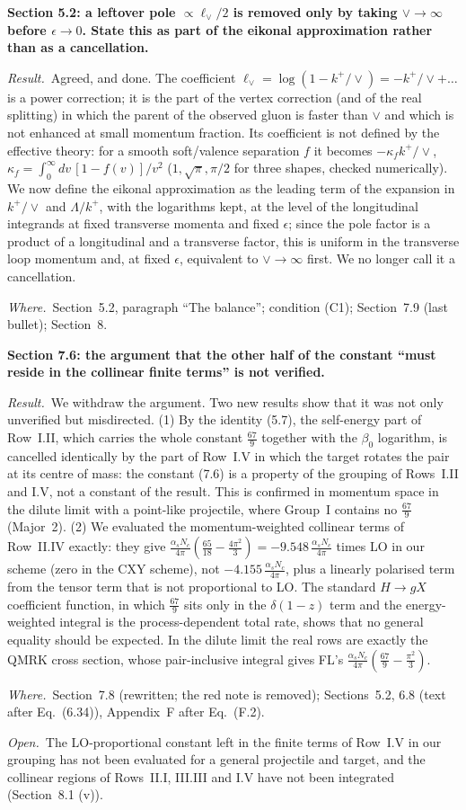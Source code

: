 \documentclass[a4paper,11pt]{article}
\newcommand{\point}[1]{\par\medskip\noindent\textbf{#1}\par}
\newcommand{\result}{\par\noindent\emph{Result.}\ }
\newcommand{\where}{\par\noindent\emph{Where.}\ }
\newcommand{\open}{\par\noindent\emph{Open.}\ }
\begin{document}
\point{Section 5.2: a leftover pole $\propto\ell_\vee/2$ is removed only by taking $\vee\to\infty$ before $\epsilon\to0$. State this as part of the eikonal approximation rather than as a cancellation.}
\result Agreed, and done. The coefficient $\ell_\vee=\log(1-k^+/\vee)=-k^+/\vee+\dots$ is a power correction; it is the part of the vertex correction (and of the real splitting) in which the parent of the observed gluon is faster than $\vee$ and which is not enhanced at small momentum fraction. Its coefficient is not defined by the effective theory: for a smooth soft/valence separation $f$ it becomes $-\kappa_fk^+/\vee$, $\kappa_f=\int_0^\infty dv\,[1-f(v)]/v^2$ ($1,\sqrt\pi,\pi/2$ for three shapes, checked numerically). We now define the eikonal approximation as the leading term of the expansion in $k^+/\vee$ and $\Lambda/k^+$, with the logarithms kept, at the level of the longitudinal integrands at fixed transverse momenta and fixed $\epsilon$; since the pole factor is a product of a longitudinal and a transverse factor, this is uniform in the transverse loop momentum and, at fixed $\epsilon$, equivalent to $\vee\to\infty$ first. We no longer call it a cancellation.
\where Section~5.2, paragraph ``The balance''; condition (C1); Section~7.9 (last bullet); Section~8.

\point{Section 7.6: the argument that the other half of the constant ``must reside in the collinear finite terms'' is not verified.}
\result We withdraw the argument. Two new results show that it was not only unverified but misdirected. (1) By the identity (5.7), the self-energy part of Row~I.II, which carries the whole constant $\frac{67}{9}$ together with the $\beta_0$ logarithm, is cancelled identically by the part of Row~I.V in which the target rotates the pair at its centre of mass: the constant (7.6) is a property of the grouping of Rows~I.II and I.V, not a constant of the result. This is confirmed in momentum space in the dilute limit with a point-like projectile, where Group~I contains no $\frac{67}{9}$ (Major~2). (2) We evaluated the momentum-weighted collinear terms of Row~II.IV exactly: they give $\frac{\alpha_sN_c}{4\pi}(\frac{65}{18}-\frac{4\pi^2}{3})=-9.548\,\frac{\alpha_sN_c}{4\pi}$ times LO in our scheme (zero in the CXY scheme), not $-4.155\,\frac{\alpha_sN_c}{4\pi}$, plus a linearly polarised term from the tensor term that is not proportional to LO. The standard $H\to gX$ coefficient function, in which $\frac{67}{9}$ sits only in the $\delta(1-z)$ term and the energy-weighted integral is the process-dependent total rate, shows that no general equality should be expected. In the dilute limit the real rows are exactly the QMRK cross section, whose pair-inclusive integral gives FL's $\frac{\alpha_sN_c}{4\pi}(\frac{67}{9}-\frac{\pi^2}{3})$.
\where Section~7.8 (rewritten; the red note is removed); Sections~5.2, 6.8 (text after Eq.~(6.34)), Appendix~F after Eq.~(F.2).
\open The LO-proportional constant left in the finite terms of Row~I.V in our grouping has not been evaluated for a general projectile and target, and the collinear regions of Rows~II.I, III.III and I.V have not been integrated (Section~8.1 (v)).
\end{document}
